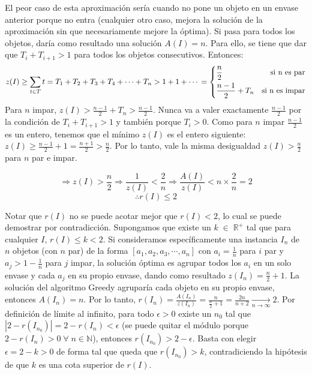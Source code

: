 \documentclass[11pt]{article}
\begin{document}
El peor caso de esta aproximación sería cuando no pone un objeto en un
envase anterior porque no entra (cualquier otro caso, mejora la solución
de la aproximación sin que necesariamente mejore la óptima). Si pasa
para todos los objetos, daría como resultado una solución \(A(I) = n\).
Para ello, se tiene que dar que \(T_i + T_{i+1} > 1\) para todos los
objetos consecutivos. Entonces: \[
z(I) \geq \sum\limits_{t \in T} t = T_1 + T_2 + T_3 + T_4 + \dotsb + T_n > 1 + 1 + \dotsb \\
= \left\{
    \begin{aligned}
        &\frac{n}{2} &\text{si n es par} \\
        &\frac{n-1}{2} + T_n &\text{si n es impar}
    \end{aligned}
\right.
\] Para \(n\) impar,
\(z(I) > \frac{n-1}{2} + T_n > \frac{n-1}{2}\). Nunca va a valer
exactamente \(\frac{n-1}{2}\) por la condición de \(T_i + T_{i+1} > 1\)
y también porque \(T_i > 0\). Como para \(n\) impar \(\frac{n-1}{2}\) es
un entero, tenemos que el mínimo \(z(I)\) es el entero siguiente:
\(z(I) \geq \frac{n-1}{2} + 1 = \frac{n+1}{2} > \frac{n}{2}\). Por lo
tanto, vale la misma desigualdad \(z(I) > \frac{n}{2}\) para \(n\) par e
impar.

\[
\Rightarrow z(I) > \frac{n}{2} \Rightarrow \frac{1}{z(I)} < \frac{2}{n} \Rightarrow \frac{A(I)}{z(I)} < n \times \frac{2}{n} = 2
\] \[
\therefore r(I) \leq 2
\]

Notar que \(r(I)\) no se puede acotar mejor que \(r(I) < 2\), lo cual 
se puede demostrar por contradicción. Supongamos que existe un
\(k \; \in \; \mathbb{R}^+\) tal que para cualquier \(I\),
\(r(I) \leq k < 2\). Si consideramos específicamente una instancia
\(I_n\) de \(n\) objetos (con \(n\) par) de la forma
\([a_1, a_2, a_3, \dotsb, a_n]\) con \(a_i = \frac{1}{n}\) para \(i\)
par y \(a_j > 1 - \frac{1}{n}\) para \(j\) impar, la solución óptima es
agrupar todos los \(a_i\) en un solo envase y cada \(a_j\) en su propio
envase, dando como resultado \(z(I_n) = \frac{n}{2} + 1\). La solución
del algoritmo Greedy agruparía cada objeto en su propio envase, entonces
\(A(I_n) = n\). Por lo tanto,
\(r(I_n)=\frac{A(I_n)}{z(I_n)} = \frac{n}{\frac{n}{2} + 1} = \frac{2n}{n+2} \xrightarrow[n \to \infty]{} 2\).
Por definición de límite al infinito, para todo \(\epsilon > 0\) existe
un \(n_0\) tal que \(|2 - r(I_{n_0})| = 2 - r(I_n) < \epsilon\) (se
puede quitar el módulo porque
\(2 - r(I_n) > 0 \; \forall \; n \in \mathbb{N}\)), entonces
\(r(I_{n_0}) > 2 - \epsilon\). Basta con elegir \(\epsilon = 2-k>0\) de
forma tal que queda que \(r(I_{n_0}) > k\), contradiciendo la hipótesis
de que \(k\) es una cota superior de \(r(I)\).
\end{document}
